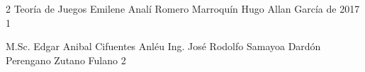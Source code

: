 \documentclass[letterpaper, 12pt]{thesisECFM}
\theoremstyle{plain}
\theoremstyle{definition}
\theoremstyle{remark}
\begin{document}
\datosThesis%
{2}%
{Teoría de Juegos}%
{Emilene Analí Romero Marroquín}%
{Hugo Allan García}%
{ de 2017}		%
{1}							%

\examenPrivado%
{M.Sc. Edgar Anibal Cifuentes Anléu}%
{Ing. José Rodolfo Samayoa Dardón}%
{Perengano}%
{Zutano}%
{Fulano 2}%

{\onehalfspacing	%




\par}
 
\frontmatter    %

{\onehalfspacing	%







\mainmatter     %




\backmatter     %



\par}               %
\end{document}
